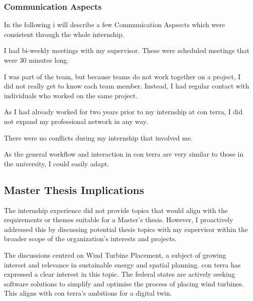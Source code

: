 \documentclass[11pt, titlepage, a4paper]{article}
\begin{document}
 \subsubsection{Communication Aspects}
In the following i will describe a few Communication Aspsects which were consistent through the whole internship.
 \begin{description}[]
     \item[Supervisor Communication:] I had bi-weekly meetings with my supervisor. These were scheduled meetings that were 30 minutes long.
     \item[Teamwork:] I was part of the team, but because teams do not work together on a project, I did not really get to know each team member. Instead, I had regular contact with individuals who worked on the same project. 
     \item[Professional Network:] As I had already worked for two years prior to my internship at con terra, I did not expand my professional network in any way.
     \item[Conflicts:] There were no conflicts during my internship that involved me.
      \item[Applied Communication Skills:]  As the general workflow and interaction in con terra are very similar to those in the university, I could easily adapt.
\end{description}

\subsection{Master Thesis Implications}
The internship experience did not provide topics that would align with the requirements or themes suitable for a Master's thesis. However, I proactively addressed this by discussing potential thesis topics with my supervisor within the broader scope of the organization's interests and projects.

The discussions centred on Wind Turbine Placement, a subject of growing interest and relevance in sustainable energy and spatial planning. con terra has expressed a clear interest in this topic. The federal states are actively seeking software solutions to simplify and optimise the process of placing wind turbines. This aligns with con terra's ambitions for a digital twin.
\end{document}
